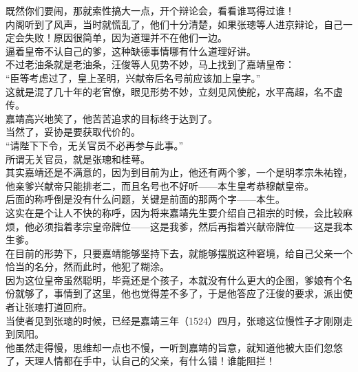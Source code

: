 \begin{multicols}{\theparacolNo}
既然你们要闹，那就索性搞大一点，开个辩论会，看看谁骂得过谁！\\

内阁听到了风声，当时就慌乱了，他们十分清楚，如果张璁等人进京辩论，自己一定会失败！原因很简单，因为道理并不在他们一边。\\

逼着皇帝不认自己的爹，这种缺德事情哪有什么道理好讲。\\

不过老油条就是老油条，汪俊等人见势不妙，马上找到了嘉靖皇帝：\\

“臣等考虑过了，皇上圣明，兴献帝后名号前应该加上皇字。”\\

这就是混了几十年的老官僚，眼见形势不妙，立刻见风使舵，水平高超，名不虚传。\\

嘉靖高兴地笑了，他苦苦追求的目标终于达到了。\\

当然了，妥协是要获取代价的。\\

“请陛下下令，无关官员不必再参与此事。”\\

所谓无关官员，就是张璁和桂萼。\\

其实嘉靖还是不满意的，因为到目前为止，他还有两个爹，一个是明孝宗朱祐镗，他亲爹兴献帝只能排老二，而且名号也不好听——本生皇考恭穆献皇帝。\\

后面的称呼倒是没有什么问题，关键是前面的那两个字——本生。\\

这实在是个让人不快的称呼，因为将来嘉靖先生要介绍自己祖宗的时候，会比较麻烦，他必须指着孝宗皇帝牌位——这是我爹，然后再指着兴献帝牌位——这是我本生爹。\\

在目前的形势下，只要嘉靖能够坚持下去，就能够摆脱这种窘境，给自己父亲一个恰当的名分，然而此时，他犯了糊涂。\\

因为这位皇帝虽然聪明，毕竟还是个孩子，本就没有什么更大的企图，爹娘有个名份就够了，事情到了这里，他也觉得差不多了，于是他答应了汪俊的要求，派出使者让张璁打道回府。\\

当使者见到张璁的时候，已经是嘉靖三年（1524）四月，张璁这位慢性子才刚刚走到凤阳。\\

他虽然走得慢，思维却一点也不慢，一听到嘉靖的旨意，就知道他被大臣们忽悠了，天理人情都在手中，认自己的父亲，有什么错！谁能阻拦！\\


\end{multicols}
